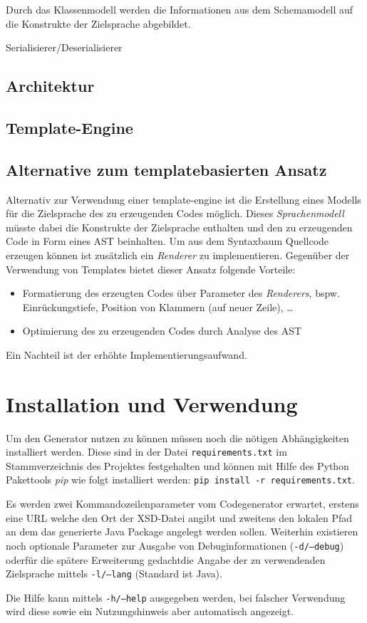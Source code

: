 Durch das Klassenmodell werden die Informationen aus dem Schemamodell auf die Konstrukte der Zielsprache abgebildet.

Serialisierer/Deserialisierer

\subsection{Architektur}

\subsection{Template-Engine}

\subsection{Alternative zum templatebasierten Ansatz}

Alternativ zur Verwendung einer \gls{template-engine} ist die Erstellung eines Modells für die Zielsprache des zu erzeugenden Codes möglich. Dieses \emph{Sprachenmodell} müsste dabei die Konstrukte der Zielsprache enthalten und den zu erzeugenden Code in Form eines \gls{AST} beinhalten.
Um aus dem Syntaxbaum Quellcode erzeugen können ist zusätzlich ein \emph{Renderer} zu implementieren. Gegenüber der Verwendung von Templates bietet dieser Ansatz folgende Vorteile:

\begin{itemize}
    \item Formatierung des erzeugten Codes über Parameter des \emph{Renderers}, bspw. Einrückungstiefe, Position von Klammern (auf neuer Zeile), \ldots
    \item Optimierung des zu erzeugenden Codes durch Analyse des \gls{AST}
\end{itemize}

Ein Nachteil ist der erhöhte Implementierungsaufwand.

\section{Installation und Verwendung}

Um den Generator nutzen zu können müssen noch die nötigen Abhängigkeiten installiert werden. Diese sind in der Datei \texttt{requirements.txt} im Stammverzeichnis des Projektes festgehalten und können mit Hilfe des Python Pakettools \emph{pip} wie folgt installiert werden: \texttt{pip install -r requirements.txt}.

Es werden zwei Kommandozeilenparameter vom Codegenerator erwartet, erstens eine \gls{URL} welche den Ort der \gls{XSD}-Datei angibt und zweitens den lokalen Pfad an dem das generierte Java Package angelegt werden sollen. Weiterhin existieren noch optionale Parameter zur Ausgabe von Debuginformationen (\texttt{-d/--debug}) oder\textemdash{}für die spätere Erweiterung gedacht\textemdash{}die Angabe der zu verwendenden Zielsprache mittels \texttt{-l/--lang} (Standard ist Java).

Die Hilfe kann mittels \texttt{-h/--help} ausgegeben werden, bei falscher Verwendung wird diese sowie ein Nutzungshinweis aber automatisch angezeigt.